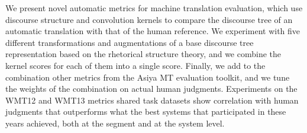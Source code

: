 We present novel automatic metrics for machine translation evaluation, which use discourse structure and convolution kernels to compare the discourse tree of an automatic translation with that of the human reference. We experiment with five different transformations and augmentations of a base discourse tree representation based on the rhetorical structure theory, and we combine the kernel scores for each of them into a single score. Finally, we add to the combination other metrics from the Asiya MT evaluation toolkit, and we tune the weights of the combination on actual human judgments. Experiments on the WMT12 and WMT13 metrics shared task datasets show correlation with human judgments that outperforms what the best systems that participated in these years achieved, both at the segment and at the system level.
